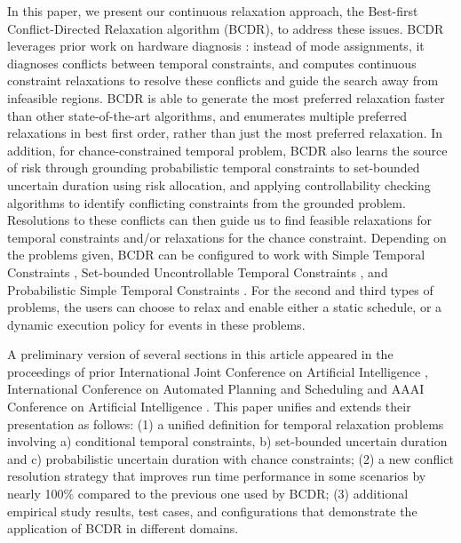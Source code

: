 \documentclass[jair,twoside,11pt,theapa]{article}
\begin{document}
In this paper, we present our continuous relaxation approach, the Best-first
Conflict-Directed Relaxation algorithm (BCDR), to address these issues. BCDR
leverages prior work on hardware diagnosis \cite{DMS1987,Williams_CDAstar_2002}:
instead of mode assignments, it diagnoses conflicts between temporal
constraints, and computes continuous constraint relaxations to resolve these
conflicts and guide the search away from infeasible regions. BCDR is able to
generate the most preferred relaxation faster than other state-of-the-art
algorithms, and enumerates multiple preferred relaxations in best first order,
rather than just the most preferred relaxation. In addition, for
chance-constrained temporal problem, BCDR also learns the source of risk through
grounding probabilistic temporal constraints to set-bounded uncertain duration
using risk allocation, and applying controllability checking algorithms to
identify conflicting constraints from the grounded problem. Resolutions to these
conflicts can then guide us to find feasible relaxations for temporal
constraints and/or relaxations for the chance constraint. Depending on the
problems given, BCDR can be configured to work with Simple Temporal Constraints
\cite{Dechter_TCN_1991}, Set-bounded Uncontrollable Temporal Constraints
\cite{Vidal99handlingcontingency}, and Probabilistic Simple Temporal Constraints
\cite{Tsamardinos02aprobabilistic}. For the second and third types of problems,
the users can choose to relax and enable either a static schedule, or a dynamic
execution policy for events in these problems.


A preliminary version of several sections in this article appeared in the
proceedings of prior International Joint Conference on Artificial Intelligence \cite{Yu_BCDR_2013},  International Conference on Automated Planning and Scheduling
\cite{Yu_CDRU_2014,cui2015optimising} and AAAI Conference on Artificial Intelligence \cite{Yu_AAAI_2015}.
This paper unifies and extends their presentation as follows: (1) a unified
definition for temporal relaxation problems involving a) conditional temporal
constraints, b) set-bounded uncertain duration and c) probabilistic uncertain
duration with chance constraints; (2) a new conflict resolution strategy that
improves run time performance in some scenarios by nearly 100\% compared to the
previous one used by BCDR; (3) additional empirical study results, test cases, and configurations that
demonstrate the application of BCDR in different domains.

%
\end{document}
